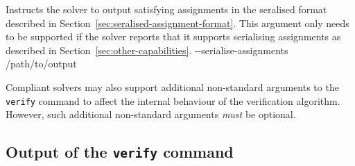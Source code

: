 

{Instructs the solver to output satisfying assignments in the seralised format described in Section~\ref{sec:seralised-assignment-format}. This argument only needs to be supported if the solver reports that it supports serialising assignments as described in Section~\ref{sec:other-capabilities}.}
{{-}-serialise-assignments /path/to/output}

\noindent Compliant solvers may also support additional non-standard arguments to the \texttt{verify} command to affect the internal behaviour of the verification algorithm. However, such additional non-standard arguments \textit{must} be optional.

\subsection{Output of the \texttt{verify} command}
\label{sec:verify-output-format}

